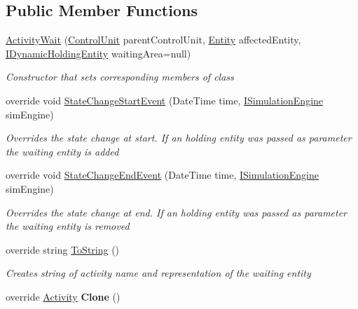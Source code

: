 \subsection*{Public Member Functions}
\begin{DoxyCompactItemize}
\item 
\hyperlink{class_simulation_core_1_1_h_c_c_m_elements_1_1_activity_wait_adb55e340b53bdd6e6ce7161cbd92c282}{Activity\+Wait} (\hyperlink{class_simulation_core_1_1_h_c_c_m_elements_1_1_control_unit}{Control\+Unit} parent\+Control\+Unit, \hyperlink{class_simulation_core_1_1_h_c_c_m_elements_1_1_entity}{Entity} affected\+Entity, \hyperlink{interface_simulation_core_1_1_h_c_c_m_elements_1_1_i_dynamic_holding_entity}{I\+Dynamic\+Holding\+Entity} waiting\+Area=null)
\begin{DoxyCompactList}\small\item\em Constructor that sets corresponding members of class \end{DoxyCompactList}\item 
override void \hyperlink{class_simulation_core_1_1_h_c_c_m_elements_1_1_activity_wait_a2c5b2b8ac5c0d002cbd45200b04279fa}{State\+Change\+Start\+Event} (Date\+Time time, \hyperlink{interface_simulation_core_1_1_simulation_classes_1_1_i_simulation_engine}{I\+Simulation\+Engine} sim\+Engine)
\begin{DoxyCompactList}\small\item\em Overrides the state change at start. If an holding entity was passed as parameter the waiting entity is added \end{DoxyCompactList}\item 
override void \hyperlink{class_simulation_core_1_1_h_c_c_m_elements_1_1_activity_wait_a300c494cdb275bf5ee46a04659230830}{State\+Change\+End\+Event} (Date\+Time time, \hyperlink{interface_simulation_core_1_1_simulation_classes_1_1_i_simulation_engine}{I\+Simulation\+Engine} sim\+Engine)
\begin{DoxyCompactList}\small\item\em Overrides the state change at end. If an holding entity was passed as parameter the waiting entity is removed \end{DoxyCompactList}\item 
override string \hyperlink{class_simulation_core_1_1_h_c_c_m_elements_1_1_activity_wait_a44910a42dbff83b3cff3fc12df9b7a05}{To\+String} ()
\begin{DoxyCompactList}\small\item\em Creates string of activity name and representation of the waiting entity \end{DoxyCompactList}\item 
override \hyperlink{class_simulation_core_1_1_h_c_c_m_elements_1_1_activity}{Activity} {\bfseries Clone} ()\hypertarget{class_simulation_core_1_1_h_c_c_m_elements_1_1_activity_wait_a238b0fc84222c9708f0a5ba6fabfed85}{}\label{class_simulation_core_1_1_h_c_c_m_elements_1_1_activity_wait_a238b0fc84222c9708f0a5ba6fabfed85}

\end{DoxyCompactItemize}
